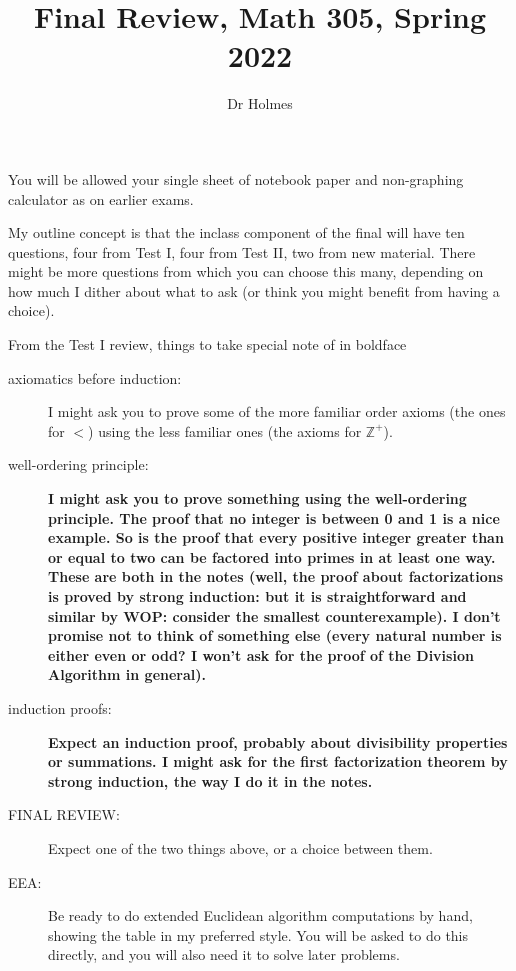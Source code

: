 \documentclass[12pt]{article}
\title{Final Review, Math 305, Spring 2022}
\author{Dr Holmes}
\begin{document}
\maketitle

You will be allowed your single sheet of notebook paper and non-graphing calculator as on earlier exams.

My outline concept is that the inclass component of the final will have ten questions, four from Test I, four from Test II, two from new material.  There might be more questions from which you can choose this many, depending on how much I dither about what to ask (or think you might benefit from having a choice).

From the Test I review, things to take special note of in boldface

\begin{description}

\item[axiomatics before induction:]  I might ask you to prove some of the more familiar order axioms (the ones for $<$) using the less familiar ones (the axioms for ${\mathbb Z}^+$).

\item[well-ordering principle:]  {\bf I might ask you to prove something using the well-ordering principle.  The proof that no integer is between 0 and 1 is a nice example.  So is the proof that every positive integer greater than or equal to two can be factored into primes in at least one way.  These are both in the notes (well, the proof about factorizations is proved by strong induction: but it is straightforward and similar by WOP:  consider the smallest counterexample).  I don't promise not to think of something else (every natural number is either even or odd?  I won't ask for the proof of the Division Algorithm in general).}

\item[induction proofs:]  {\bf Expect an induction proof, probably about divisibility properties or summations.  I might ask for the first factorization theorem by strong induction, the way I do it in the notes.}

\item[FINAL REVIEW:]  Expect one of the two things above, or a choice between them.

\item[EEA:]    Be ready to do extended Euclidean algorithm computations by hand, showing the table in my preferred style.  You will be asked to do this directly, and you will also need it to solve later problems.


\end{description}
\end{document}
